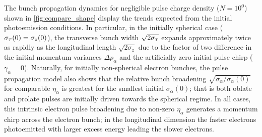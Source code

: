 The bunch propagation dynamics for negligible pulse charge density ($ N = 10^{0} $) shown in \ref{fig:compare_shape} display the trends expected from the initial photoemission conditions.
In particular, in the initially spherical case ($ \sigma_{{\scriptscriptstyle T}} (0) = \sigma_{z} (0) $), the transverse bunch width $ \sqrt{2 \sigma_{{\scriptscriptstyle T}}} $ expands approximately twice as rapidly as the longitudinal length $ \sqrt{2 \sigma_{z}} $ due to the factor of two difference in the initial momentum variances $ \Delta p_{\alpha} $ and the artificially zero initial pulse chirp ($ \gamma_{\alpha} = 0 $).
Naturally, for initially non-spherical electron bunches, the pulse propagation model also shows that the relative bunch broadening $ \sqrt{ \sigma_{\alpha} / \sigma_{\alpha} (0) } $ for comparable $ \eta_{\alpha} $ is greatest for the smallest initial $ \sigma_{\alpha} (0) $; that is both oblate and prolate pulses are initially driven towards the spherical regime.
In all cases, this intrinsic electron pulse broadening due to non-zero $ \eta_{\alpha} $ generates a momentum chirp across the electron bunch; in the longitudinal dimension the faster electrons photoemitted with larger excess energy leading the slower electrons.

